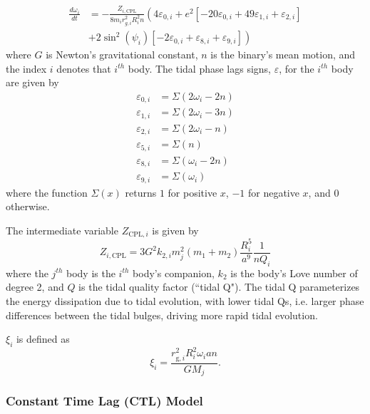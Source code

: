 \documentclass[twocolumn]{aastex61}
\begin{document}
\begin{equation} \label{eqn:cpl:omega}
\begin{split}
\frac{d\omega_i}{dt}& = -\frac{Z_{i,\mathrm{CPL}}}{8m_i r_{g,i}^2 R_i^2 n} \left(4 \varepsilon_{0,i} + e^2\left[-20\varepsilon_{0,i} + 49\varepsilon_{1,i} + \varepsilon_{2,i} \right] \right. \\
& \left. + 2 \sin^2(\psi_i) \left[ -2 \varepsilon_{0,i} + \varepsilon_{8,i} + \varepsilon_{9,i} \right] \right)
\end{split}
\end{equation}
where $G$ is Newton's gravitational constant, $n$ is the binary's mean motion, and the index $i$ denotes that $i^{th}$ body. The tidal phase lags signs, $\varepsilon$, for the $i^{th}$ body are given by
\begin{equation} \label{eqn:cpl:eps}
\begin{split}
\varepsilon_{0,i} & = \Sigma(2 \omega_i - 2n) \\
\varepsilon_{1,i} & = \Sigma(2 \omega_i - 3n) \\
\varepsilon_{2,i} & = \Sigma(2 \omega_i - n) \\
\varepsilon_{5,i} & = \Sigma(n) \\
\varepsilon_{8,i} & = \Sigma(\omega_i - 2n) \\
\varepsilon_{9,i} & = \Sigma(\omega_i)
\end{split}
\end{equation}
where the function $\Sigma(x)$ returns $1$ for positive $x$, $-1$ for negative $x$, and $0$ otherwise.

The intermediate variable $Z_{\mathrm{CPL},i}$ is given by
\begin{equation} \label{eqn:cpl:z}
Z_{i,\mathrm{CPL}} = 3 G^2 k_{2,i} m_j^2 (m_1 + m_2) \frac{R_i^5}{a^9} \frac{1}{n Q_i}
\end{equation}
where the $j^{th}$ body is the $i^{th}$ body's companion, $k_{2}$ is the body's Love number of degree 2, and $Q$ is the tidal quality factor (``tidal Q"). The tidal Q parameterizes the energy dissipation due to tidal evolution, with lower tidal Qs, i.e. larger phase differences between the tidal bulges, driving more rapid tidal evolution.

$\xi_i$ is defined as
\begin{equation}\label{eqn:cpl:chi}
\xi_i = \frac{r_{\mathrm{g},i}^2 R_i^2 \omega_i a n }{ G M_j}.
\end{equation}

\subsubsection{Constant Time Lag (CTL) Model}
\end{document}
